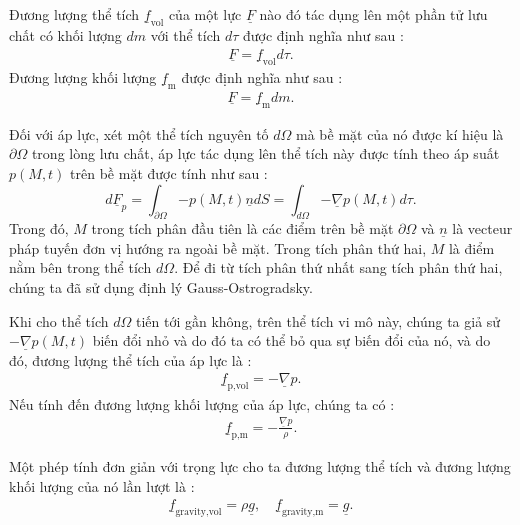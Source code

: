 \documentclass[CO_LUU_CHAT.tex]{subfiles}
\begin{document}
	Đương lượng thể tích $\underline{f}_{\text{vol}}$ của một lực $\underline{F}$ nào đó tác dụng lên một phần tử lưu chất có khối lượng $dm$ với thể tích $d\tau$ được định nghĩa như sau :
		\begin{equation}
			\begin{aligned}
				\underline{F}=\underline{f}_{\text{vol}}d\tau.
			\end{aligned}
		\end{equation}
	Đương lượng khối lượng $\underline{f}_{\text{m}}$ được định nghĩa như sau :
		\begin{equation}
			\begin{aligned}
				\underline{F}=\underline{f}_{\text{m}}dm.
			\end{aligned}
		\end{equation}

	Đối với áp lực, xét một thể tích nguyên tố $d\Omega$ mà bề mặt của nó được kí hiệu là $\partial\Omega$ trong lòng lưu chất, áp lực tác dụng lên thể tích này được tính theo áp suất $p(M,t)$ trên bề mặt được tính như sau :
		\[
			d\underline F_p  = \int_{\partial \Omega } { - p\left( {M,t} \right)\underline n dS}  = \int_{d\Omega } { - \underline \nabla  p\left( {M,t} \right)d\tau }.
		\]
	Trong đó, $M$ trong tích phân đầu tiên là các điểm trên bề mặt $\partial\Omega$ và $\underline{n}$ là vecteur pháp tuyến đơn vị hướng ra ngoài bề mặt. Trong tích phân thứ hai, $M$ là điểm nằm bên trong thể tích $d\Omega$. Để đi từ tích phân thứ nhất sang tích phân thứ hai, chúng ta đã sử dụng định lý Gauss-Ostrogradsky.

	Khi cho thể tích $d\Omega$ tiến tới gần không, trên thể tích vi mô này, chúng ta giả sử $-\underline\nabla p\left(M,t\right)$ biến đổi nhỏ và do đó ta có thể bỏ qua sự biến đổi của nó, và do đó, đương lượng thể tích của áp lực là :
		\begin{equation}
			\begin{aligned}
				\boxed{
					\underline{f}_{\text{p,vol}}=-\underline\nabla p.
				}
			\end{aligned}
		\end{equation}
	Nếu tính đến đương lượng khối lượng của áp lực, chúng ta có :
		\begin{equation}
			\begin{aligned}
				\boxed{
					\underline{f}_{\text{p,m}}=-\frac{\underline\nabla p}{\rho}.
				}
			\end{aligned}
		\end{equation}

	Một phép tính đơn giản với trọng lực cho ta đương lượng thể tích và đương lượng khối lượng của nó lần lượt là :
		\begin{equation}
			\begin{aligned}
				\underline{f}_{\text{gravity,vol}}=\rho\underline{g},\quad\underline{f}_{\text{gravity,m}}=\underline{g}.
			\end{aligned}
		\end{equation}
\end{document}
